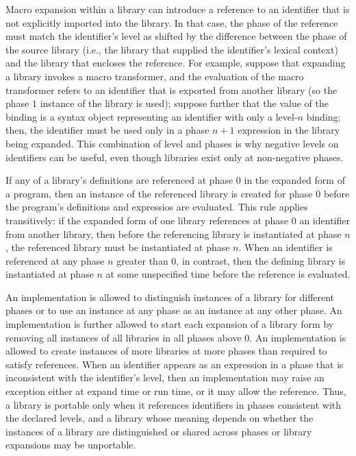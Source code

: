 Macro expansion within a library can introduce a reference to an
identifier that is not explicitly imported into the library. In that
case, the phase of the reference must match the identifier's level as
shifted by the difference between the phase of the source library
(i.e., the library that supplied the identifier's lexical context) and
the library that encloses the reference. For example, suppose that
expanding a library invokes a macro transformer, and the evaluation of
the macro transformer refers to an identifier that is exported from
another library (so the phase $1$ instance of the library is used);
suppose further that the value of the binding is a syntax object
representing an identifier with only a level-$n$ binding; then, the
identifier must be used only in a phase $n+1$ expression in the
library being expanded. This combination of level and phases is why
negative levels on identifiers can be useful, even though libraries
exist only at non-negative phases.

If any of a library's definitions are referenced at phase $0$ in the
expanded form of a program, then an instance of the referenced library
is created for phase $0$ before the program's definitions and
expressios are evaluated. This rule applies transitively: if the
expanded form of one library references at phase $0$ an identifier
from another library, then before the referencing library is
instantiated at phase $n$, the referenced library must be instantiated
at phase $n$. When an identifier is referenced at any phase $n$
greater than 0, in contrast, then the defining library is instantiated
at phase $n$ at some unspecified time before the reference is
evaluated.

An implementation is allowed to distinguish instances of a library for
different phases or to use an instance at any phase as an instance at
any other phase. An implementation is further allowed to start each
expansion of a {\cf library} form by removing all instances of all
libraries in all phases above $0$. An implementation is allowed to
create instances of more libraries at more phases than required to
satisfy references. When an identifier appears as an expression in a
phase that is inconsistent with the identifier's level, then an
implementation may raise an exception either at expand time or run
time, or it may allow the reference. Thus, a library is portable only
when it references identifiers in phases consistent with the declared
levels, and a library whose meaning depends on whether the
instances of a library are distinguished or shared across phases or
{\cf library} expansions may be unportable.

